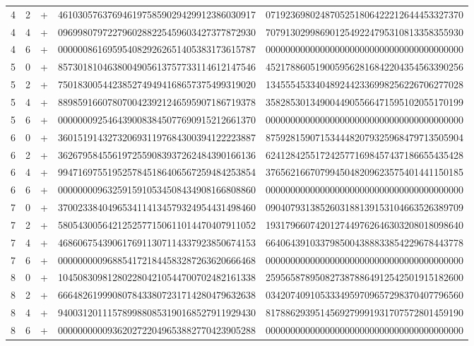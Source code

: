 \begin{longtable}{rrrll}
4 & 2 & + & 4610305763769461975859029429912386030917 & 0719236980248705251806422212644453327370 \\
4 & 4 & + & 0969980797227960288225459603427377872930 & 7079130299869012549224795310813358355930 \\
4 & 6 & + & 0000008616959540829262651405383173615787 & 0000000000000000000000000000000000000000 \\
5 & 0 & + & 8573018104638004905613757733114612147546 & 4521788605190059562816842204354563390256 \\
5 & 2 & + & 7501830054423852749494168657375499319020 & 1345554533404892442336998256226706277028 \\
5 & 4 & + & 8898591660780700423921246595907186719378 & 3582853013490044905566471595102055170199 \\
5 & 6 & + & 0000000925464390083845077690915212661370 & 0000000000000000000000000000000000000000 \\
6 & 0 & + & 3601519143273206931197684300394122223887 & 8759281590715344482079325968479713505904 \\
6 & 2 & + & 3626795845561972559083937262484390166136 & 6241284255172425771698457437186655435428 \\
6 & 4 & + & 9947169755195257845186406567259484253854 & 3765621667079945048209623575401441150185 \\
6 & 6 & + & 0000000096325915910534508434908166808860 & 0000000000000000000000000000000000000000 \\
7 & 0 & + & 3700233840496534114134579324954431498460 & 0904079313852603188139153104663526389709 \\
7 & 2 & + & 5805430056421252577150611014470407911052 & 1931796607420127449762646303208018098640 \\
7 & 4 & + & 4686067543906176911307114337923850674153 & 6640643910337985004388833854229678443778 \\
7 & 6 & + & 0000000009688541721844583287263620666468 & 0000000000000000000000000000000000000000 \\
8 & 0 & + & 1045083098128022804210544700702482161338 & 2595658789508273878864912542501915182600 \\
8 & 2 & + & 6664826199908078433807231714280479632638 & 0342074091053334959709657298370407796560 \\
8 & 4 & + & 9400312011157899880853190168527911929430 & 8178862939514569279991931707572801459190 \\
8 & 6 & + & 0000000000936202722049653882770423905288 & 0000000000000000000000000000000000000000 \\

\end{longtable}
